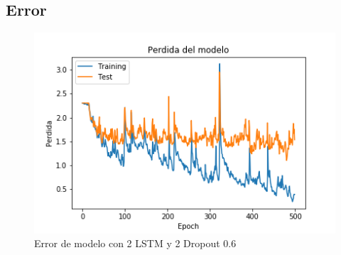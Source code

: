 \subsection{Error}\label{erro_modelo}

\begin{figure}[H]
	\centering
	\includegraphics[width=0.7\linewidth]{Figures/MODEL_cost}
	\caption{Error de modelo con 2 LSTM y 2 Dropout 0.6}
	\label{fig:modelcost}
\end{figure}